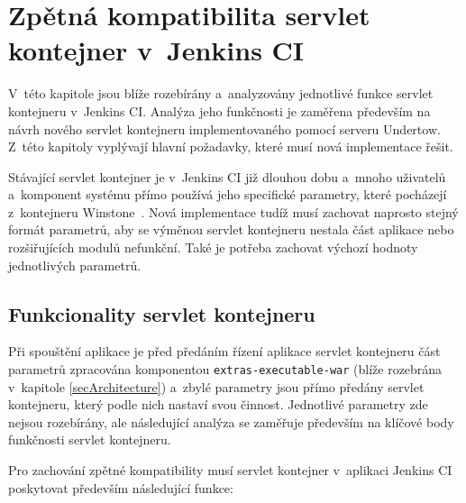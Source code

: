  


    \section{Zpětná kompatibilita servlet kontejner v~Jenkins CI}   \label{secKompatibilita}
        V~této kapitole jsou blíže rozebírány a~analyzovány jednotlivé funkce servlet
        kontejneru v~Jenkins CI. Analýza jeho funkčnosti je zaměřena především na 
        návrh nového servlet kontejneru implementovaného pomocí serveru Undertow.
        Z~této kapitoly vyplývají hlavní požadavky, které musí nová implementace
        řešit.

        Stávající servlet kontejner je v~Jenkins CI již dlouhou dobu
        a~mnoho uživatelů a~komponent systému přímo používá jeho specifické
        parametry, které pocházejí z~kontejneru Winstone~\cite{kohsukeTopic}. Nová implementace
        tudíž musí zachovat naprosto stejný formát parametrů, aby 
        se výměnou servlet kontejneru nestala část aplikace nebo rozšiřujících modulů nefunkční.
        Také je potřeba zachovat výchozí hodnoty jednotlivých parametrů.

        \subsection{Funkcionality servlet kontejneru} \label{kapFunkcionality}
            Při spouštění aplikace je před předáním řízení aplikace servlet kontejneru
            část parametrů zpracována komponentou \texttt{extras-executable-war} (blíže 
            rozebrána v~kapitole \ref{secArchitecture}) a~zbylé parametry jsou přímo
            předány servlet kontejneru, který podle nich nastaví svou činnost.
            Jednotlivé parametry zde nejsou rozebírány, ale následující analýza
            se zaměřuje především na klíčové body funkčnosti servlet kontejneru.

            \newpage
            Pro zachování zpětné kompatibility musí servlet kontejner v~aplikaci 
            Jenkins CI poskytovat především následující funkce:
            
